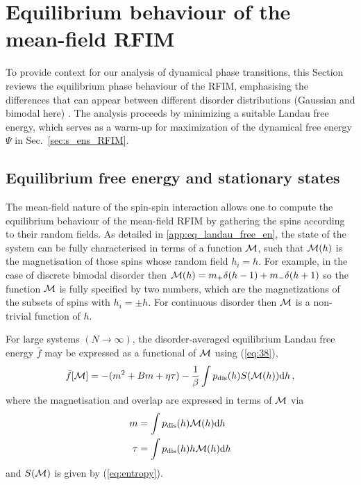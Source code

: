 \documentclass{iopart}
\newcommand{\eqref}[1]{(\ref{#1})}
\newcommand{\dst}[0]{\ensuremath{\mathrm{d}}}
\begin{document}
\section{Equilibrium behaviour of the mean-field RFIM}\label{sec:eq}

To provide context for our analysis of dynamical phase transitions, this Section reviews the equilibrium phase behaviour of the RFIM, emphasising the differences that can appear between different disorder distributions (Gaussian and bimodal here) \cite{schneider1977random, aharony1978tricritical, krapivsky2010kinetic}.   The analysis proceeds by minimizing a suitable Landau free energy, which serves as a warm-up for maximization of the dynamical free energy $\Psi$ in Sec.~\ref{sec:s_ens_RFIM}.

\subsection{Equilibrium free energy and stationary states}
\label{sec:eq_free_en}


\newcommand{\mm}{{\cal M}}
\newcommand{\pdis}{p_{\rm dis}}

The mean-field nature of the spin-spin interaction allows one to compute the equilibrium behaviour of the mean-field RFIM by gathering the spins according to their random fields.
As detailed in \ref{app:eq_landau_free_en}, the state of the system can be fully characterised in terms of a function $\mm$, such that $\mm(h)$ is the magnetisation of those spins whose random field $h_i=h$.  For example, in the case of discrete bimodal disorder then $\mm(h) = m_+ \delta(h-1) + m_- \delta(h+1)$ so the function $\mm$ is fully specified by two numbers, which are the magnetizations of the subsets of spins with $h_i=\pm h$.  For continuous disorder then $\mm$ is a non-trivial function of $h$. 

For large systems $(N\to\infty)$, the disorder-averaged equilibrium Landau free energy $\bar{f}$ may be expressed as a functional of ${\cal M}$ using \eqref{eq:38},
\begin{equation}
  \label{eq:49}
  \bar{f}[\mm] = - (m^{2} + Bm + \eta \tau) - \frac{1}{\beta} \int \pdis(h) S(\mm(h)) \dst h \, ,
\end{equation}
where the magnetisation and overlap are expressed in terms of $\mm$ via
\begin{eqnarray}
\label{eq:m-mm}
m & = \int \pdis(h) \mm(h) \dst h \\
\tau & =\int \pdis(h) h \mm(h) \dst h
\end{eqnarray}
and $S(\mm)$ is given by (\ref{eq:entropy}).
\end{document}
